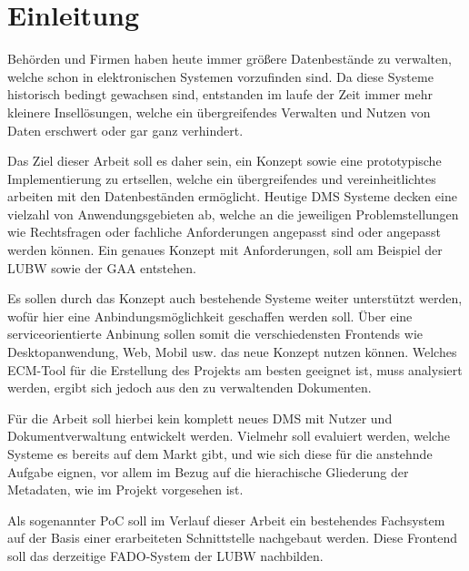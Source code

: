 \section{Einleitung} \label{Einfuehrung}
Beh\"orden und Firmen haben heute immer gr\"o\ss{}ere Datenbest\"ande zu verwalten, welche schon in elektronischen Systemen vorzufinden sind. Da diese Systeme historisch bedingt gewachsen sind, entstanden im laufe der Zeit immer mehr kleinere Insell\"osungen, welche ein \"ubergreifendes Verwalten und Nutzen von Daten erschwert oder gar ganz verhindert.

Das Ziel dieser Arbeit soll es daher sein, ein Konzept sowie eine prototypische Implementierung zu ertsellen, welche ein \"ubergreifendes und vereinheitlichtes arbeiten mit den Datenbest\"anden erm\"oglicht. Heutige \ac{DMS} Systeme decken eine vielzahl von Anwendungsgebieten ab, welche an die jeweiligen Problemstellungen wie Rechtsfragen oder fachliche Anforderungen angepasst sind oder angepasst werden k\"onnen.
Ein genaues Konzept mit Anforderungen, soll am Beispiel der \ac{LUBW} sowie der \ac{GAA} entstehen.
\cite{Dokumenten-Management}

Es sollen durch das Konzept auch bestehende Systeme weiter unterst\"utzt werden, wof\"ur hier eine Anbindungsm\"oglichkeit geschaffen werden soll. \"Uber eine serviceorientierte Anbinung sollen somit die verschiedensten Frontends wie Desktopanwendung, Web, Mobil usw. das neue Konzept nutzen k\"onnen. Welches \ac{ECM}-Tool f\"ur die Erstellung des Projekts am besten geeignet ist, muss analysiert werden, ergibt sich jedoch aus den zu verwaltenden Dokumenten.

F\"ur die Arbeit soll hierbei kein komplett neues \ac{DMS} mit Nutzer und Dokumentverwaltung entwickelt werden. Vielmehr soll evaluiert werden, welche Systeme es bereits auf dem Markt gibt, und wie sich diese f\"ur die anstehnde Aufgabe eignen, vor allem im Bezug auf die hierachische Gliederung der Metadaten, wie im Projekt vorgesehen ist. 

Als sogenannter \ac{PoC} soll im Verlauf dieser Arbeit ein bestehendes Fachsystem auf der Basis einer erarbeiteten Schnittstelle nachgebaut werden. Diese Frontend soll das derzeitige \ac{FADO}-System der \ac{LUBW} nachbilden.